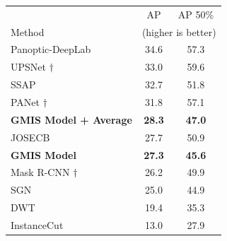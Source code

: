 \begin{figure}[t]
\begin{minipage}[t]{0.32\textwidth}
\centering
    \scriptsize
    \vspace*{-1.5em}
\begin{tabular}[t]{l|cc}
            & AP  & AP 50\% \\ 
        Method & \multicolumn{2}{c}{(higher is better)} \\ \midrule
           Panoptic-DeepLab \cite{cheng2019panopticdeeplab} & 34.6 & 57.3 \\
           UPSNet \cite{xiong2019upsnet} $\dagger$ & 33.0 & 59.6 \\
           SSAP \cite{Gao_2019_ICCV} & 32.7 & 51.8 \\
           PANet \cite{liu2018path} $\dagger$ & 31.8 & 57.1 \\
           \textbf{GMIS Model + \algname{} Average} & \textbf{28.3} & \textbf{47.0} \\ 
           JOSECB \cite{neven2019instance} & 27.7 & 50.9 \\
           \textbf{GMIS Model} \cite{liu2018affinity} & \textbf{27.3} & \textbf{45.6} \\
           Mask R-CNN \cite{he2017mask} $\dagger$ & 26.2 & 49.9 \\
           SGN \cite{liu2017sgn} & 25.0 & 44.9 \\
           DWT \cite{bai2017deep} & 19.4 & 35.3 \\
           InstanceCut \cite{kirillov2017instancecut} & 13.0 & 27.9 \\
        \end{tabular}
    \vspace*{0.7em}
    \label{tab:results_cityscapes}
    \label{tab:results_cityscapes_test}
\end{minipage}
\end{figure}

